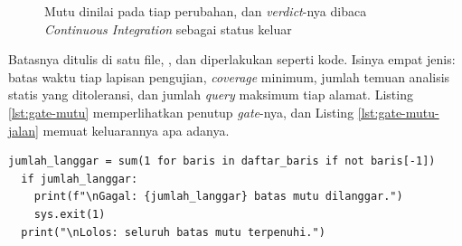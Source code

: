 \begin{figure}[!htb]
  \centering
  \caption{Mutu dinilai pada tiap perubahan, dan \textit{verdict}-nya dibaca
           \textit{Continuous Integration} sebagai status keluar}
  \label{fig:gate-mutu}
\end{figure}

Batasnya ditulis di satu file, , dan
diperlakukan seperti kode. Isinya empat jenis: batas waktu tiap lapisan
pengujian, \textit{coverage} minimum, jumlah temuan analisis statis yang
ditoleransi, dan jumlah \textit{query} maksimum tiap alamat. Listing
\ref{lst:gate-mutu} memperlihatkan penutup \textit{gate}-nya, dan Listing
\ref{lst:gate-mutu-jalan} memuat keluarannya apa adanya.

\begin{lstlisting}[style=PythonStyle, caption={Status keluar yang memblokir merge, tersedia di \berkas{sources/chapter06/gate-mutu.py}}, label={lst:gate-mutu}]
  jumlah_langgar = sum(1 for baris in daftar_baris if not baris[-1])
  if jumlah_langgar:
    print(f"\nGagal: {jumlah_langgar} batas mutu dilanggar.")
    sys.exit(1)
  print("\nLolos: seluruh batas mutu terpenuhi.")
\end{lstlisting}

